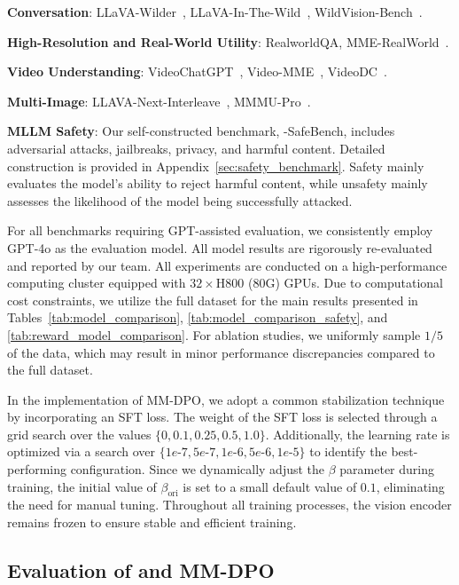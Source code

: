 \textbf{Conversation}:
LLaVA-Wilder~\cite{li2024llavanext-strong}, LLaVA-In-The-Wild~\cite{liu2023visual}, WildVision-Bench~\cite{lu2024wildvision}.

\textbf{High-Resolution and Real-World Utility}:
RealworldQA, MME-RealWorld~\cite{zhang2024mme}.

\textbf{Video Understanding}:
VideoChatGPT~\cite{Maaz2023VideoChatGPT}, Video-MME~\cite{fu2024video}, VideoDC~\cite{li2024llavanext-strong}.

\textbf{Multi-Image}:
LLAVA-Next-Interleave~\cite{li2024llava}, MMMU-Pro~\cite{yue2024mmmu}.

\textbf{MLLM Safety}:
Our self-constructed benchmark, \abbr-SafeBench, includes adversarial attacks, jailbreaks, privacy, and harmful content. Detailed construction is provided in Appendix~\ref{sec:safety_benchmark}. Safety mainly evaluates the model's ability to reject harmful content, while unsafety mainly assesses the likelihood of the model being successfully attacked.

For all benchmarks requiring GPT-assisted evaluation, we consistently employ GPT-4o as the evaluation model. All model results are rigorously re-evaluated and reported by our team. All experiments are conducted on a high-performance computing cluster equipped with $32\times$H800 (80G) GPUs. Due to computational cost constraints, we utilize the full dataset for the main results presented in Tables~\ref{tab:model_comparison}, \ref{tab:model_comparison_safety}, and \ref{tab:reward_model_comparison}. For ablation studies, we uniformly sample $1/5$ of the data, which may result in minor performance discrepancies compared to the full dataset.

In the implementation of MM-DPO, we adopt a common stabilization technique by incorporating an SFT loss. The weight of the SFT loss is selected through a grid search over the values $\{0, 0.1, 0.25, 0.5, 1.0\}$. Additionally, the learning rate is optimized via a search over $\{1e\text{-}7, 5e\text{-}7, 1e\text{-}6, 5e\text{-}6, 1e\text{-}5\}$ to identify the best-performing configuration. Since we dynamically adjust the $\beta$ parameter during training, the initial value of $\beta_{\text{ori}}$ is set to a small default value of $0.1$, eliminating the need for manual tuning. Throughout all training processes, the vision encoder remains frozen to ensure stable and efficient training.


\subsection{Evaluation of \abbr and MM-DPO}


